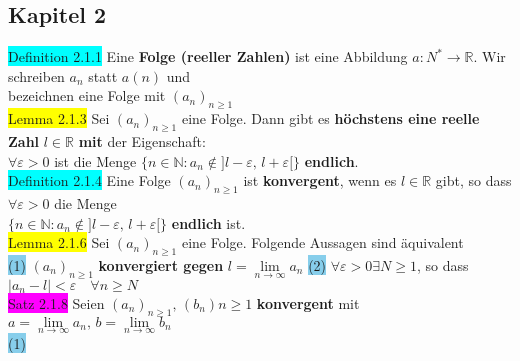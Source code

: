 \documentclass[10pt]{article}
\begin{document}
\subsection*{Kapitel 2}
\colorbox{cyan}{Definition 2.1.1} Eine \textbf{Folge (reeller Zahlen)} ist 
                eine Abbildung $a:N^{*}\longrightarrow\mathbb{R}$. 
                Wir schreiben $a_n$ statt $a(n)$ und \\
        \indent bezeichnen eine Folge mit 
                \textcolor{NavyBlue}{$(a_n)_{n\geqslant 1}$}\\
\colorbox{yellow}{Lemma 2.1.3} Sei $(a_n)_{n\geqslant 1}$ eine 
                Folge. Dann gibt es \textbf{höchstens eine reelle Zahl} 
                \textcolor{NavyBlue}{$l\in\mathbb{R}$} 
                \textbf{mit} der Eigenschaft: \\
        \indent \textcolor{NavyBlue}{$\forall\varepsilon >0$} ist die Menge 
                \textcolor{NavyBlue}{
                $\{n\in\mathbb{N}:a_n\notin ]l-\varepsilon,\,l+\varepsilon[\}$} 
                \textbf{endlich}.\\
\colorbox{cyan}{Definition 2.1.4} Eine Folge $(a_n)_{n\geqslant 1}$ ist 
                \textbf{konvergent}, wenn es \textcolor{NavyBlue}{$l\in\mathbb{R}$} 
                gibt, so dass 
                \textcolor{NavyBlue}{$\forall\varepsilon >0$} die Menge \\
        \indent \textcolor{NavyBlue}{
                $\{n\in\mathbb{N}:a_n\notin ]l-\varepsilon,\, l+\varepsilon[\}$} 
                \textbf{endlich} ist.\\
\colorbox{yellow}{Lemma 2.1.6} Sei $(a_n)_{n\geqslant 1}$ eine Folge. 
                Folgende Aussagen sind äquivalent\\
        \indent \colorbox{SkyBlue}{(1)} \textcolor{NavyBlue}{$(a_n)_{n\geqslant 1}$} 
                \textbf{konvergiert gegen} 
                \textcolor{NavyBlue}{$l=\lim\limits_{n\to\infty}a_n$}
                \quad\colorbox{SkyBlue}{(2)} 
                \textcolor{NavyBlue}{$\forall\varepsilon >0\exists N\geqslant 1$}, 
                so dass 
                \textcolor{NavyBlue}{$|a_n-l|<\varepsilon \quad\forall n\geqslant N$}\\
\colorbox{magenta}{Satz 2.1.8} Seien 
                \textcolor{NavyBlue}{$(a_n)_{n\geqslant 1},\,(b_n){n\geqslant 1}$} 
                \textbf{konvergent} mit 
                \textcolor{NavyBlue}{$a=\lim\limits_{n\to\infty}a_n,\,
                b=\lim\limits_{n\to\infty}b_n$}\\
        \indent \colorbox{SkyBlue}{(1)} 
\end{document}
